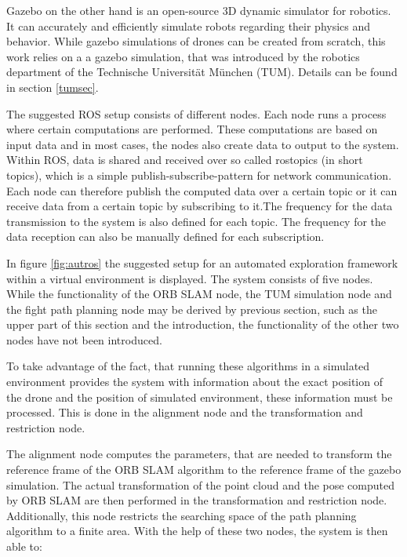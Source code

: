 	Gazebo on the other hand is an open-source 3D dynamic simulator for robotics. It can accurately and efficiently simulate robots regarding
	their physics and behavior. While gazebo simulations of drones can be created from scratch, this work relies on a a gazebo simulation, that was introduced 
	by the robotics department of the Technische Universität München (TUM). Details can be found in section \ref{tumsec}.
	
	The suggested ROS setup consists of different nodes. Each node runs a process where certain computations are performed. These computations are based on input data
	and in most cases, the nodes also create data to output to the system. Within ROS, data is shared and received over so called rostopics (in short topics), which is a simple publish-subscribe-pattern 
	for network communication. Each node can therefore publish the computed 
	data over a certain topic or it can receive data from a certain topic by subscribing to it.The frequency for the data transmission to the system is 
	also defined for each topic. The frequency  for the data reception can also be manually defined for each subscription.
	
	
	In figure \ref{fig:autros} the suggested setup for an automated exploration framework within a virtual environment is displayed. The system consists of five nodes. 
	While the functionality of the ORB SLAM node, the TUM simulation node and the fight path planning node may be derived by previous section, such as the upper part of 
	this section and the introduction, the functionality of the other two nodes have not been introduced. 
	
	To take advantage of the fact, that running these algorithms in a simulated environment provides the system with information about the exact position of the 
	drone and the position of simulated environment, these information must be processed. This is done in the alignment node and the transformation and restriction node. 
	
	The alignment node computes the parameters, that are needed to transform the reference frame of the ORB SLAM algorithm to the reference frame of the gazebo simulation. 
	The actual transformation of the point cloud and the pose computed by ORB SLAM are then performed in the transformation and restriction node. Additionally, this node 
	restricts the searching space of the path planning algorithm to a finite area. With the help of these two nodes, the system is then able to: 
	
